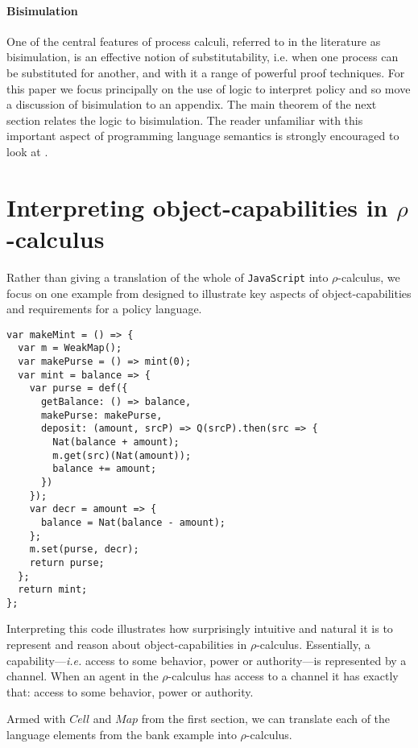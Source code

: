 \documentclass[]{amsart}
\theoremstyle{definition}
\theoremstyle{remark}
\numberwithin{equation}{subsection}
\newcommand{\rhoc}{$\rho$-calculus}
\begin{document}
\paragraph{Bisimulation}

One of the central features of process calculi, referred to in the
literature as bisimulation, is an effective notion of
substitutability, i.e. when one process can be substituted for
another, and with it a range of powerful proof techniques. For this
paper we focus principally on the use of logic to interpret policy and
so move a discussion of bisimulation to an appendix. The main theorem
of the next section relates the logic to bisimulation. The reader
unfamiliar with this important aspect of programming language
semantics is strongly encouraged to look at
\cite{DBLP:LNCS/Sangiorgi06}.

\section{Interpreting object-capabilities in \rhoc}

Rather than giving a translation of the whole of {\tt JavaScript} into
\rhoc, we focus on one example from
\cite{Drossopoulou:2013:NCP:2489804.2489811} designed to illustrate
key aspects of object-capabilities and requirements for a policy
language.

\begin{verbatim}
var makeMint = () => {
  var m = WeakMap();
  var makePurse = () => mint(0);
  var mint = balance => {
    var purse = def({
      getBalance: () => balance,
      makePurse: makePurse,
      deposit: (amount, srcP) => Q(srcP).then(src => {
        Nat(balance + amount);
        m.get(src)(Nat(amount));
        balance += amount;
      })
    });
    var decr = amount => {
      balance = Nat(balance - amount);
    };
    m.set(purse, decr);
    return purse;
  };
  return mint;
};
\end{verbatim}

Interpreting this code illustrates how surprisingly intuitive and
natural it is to represent and reason about object-capabilities in
\rhoc. Essentially, a capability---{\em i.e.} access to some behavior, power
or authority---is represented by a channel. When an agent in the \rhoc\;
has access to a channel it has exactly that: access to some behavior,
power or authority.


Armed with $Cell$ and $Map$ from the first section, we can translate
each of the language elements from the bank example into \rhoc.
\end{document}
